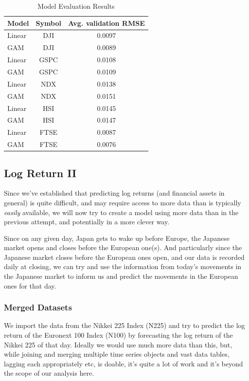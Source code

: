 \documentclass[12pt, twoside,hidelinks]{article}
\theoremstyle{definition}
\numberwithin{equation}{section}
\begin{document}
\begin{table}[H]
\centering
\caption{Model Evaluation Results}
\label{table:model_evaluation}
\begin{tabular}{lcc}
\hline
\textbf{Model} & \textbf{Symbol} & \textbf{Avg. validation RMSE} \\
\hline
Linear & DJI & 0.0097 \\
GAM & DJI & 0.0089 \\
Linear & GSPC & 0.0108 \\
GAM & GSPC & 0.0109 \\
Linear & NDX & 0.0138 \\
GAM & NDX & 0.0151 \\
Linear & HSI & 0.0145 \\
GAM & HSI & 0.0147 \\
Linear & FTSE & 0.0087\\
GAM & FTSE & 0.0076 \\
\hline
\end{tabular}
\end{table}

\subsection{Log Return II}\label{sec:analysis:alt_mod}

Since we've established that predicting log returns (and financial assets in general) is quite difficult, and may require access to more data than is typically \textit{easily} available, we will now try to create a model using more data than in the previous attempt, and potentially in a more clever way. 
\newline

Since on any given day, Japan gets to wake up before Europe, the Japanese market opens and closes before the European one(s). And particularly since the Japanese market closes before the European ones open, and our data is recorded daily at closing, we can try and use the information from today's movements in the Japanese market to inform us and predict the movements in the European ones for that day. 

\subsubsection{Merged Datasets}
We import the data from the Nikkei 225 Index (N225) and try to predict the log return of the Euronext 100 Index (N100) by forecasting the log return of the Nikkei 225 of that day. Ideally we would use much more data than this, but, while joining and merging multiple time series objects and vast data tables, lagging each appropriately etc, is doable, it's quite a lot of work and it's beyond the scope of our analysis here.
\end{document}
